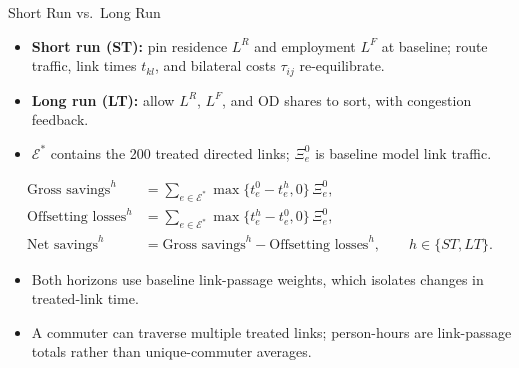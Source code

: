 \documentclass[11pt,aspectratio=169]{beamer}
\begin{document}
\begin{frame}{Short Run vs.\ Long Run}
\small
\begin{itemize}
  \item \textbf{Short run (ST):} pin residence $L^R$ and employment $L^F$ at baseline; route traffic, link times $t_{kl}$, and bilateral costs $\tau_{ij}$ re-equilibrate.
  \item \textbf{Long run (LT):} allow $L^R$, $L^F$, and OD shares to sort, with congestion feedback.
  \item $\mathcal E^*$ contains the 200 treated directed links; $\Xi_e^0$ is baseline model link traffic.
\end{itemize}
\vspace{-0.35em}
{\scriptsize
\begin{align*}
\text{Gross savings}^{h}
  &=\sum_{e\in\mathcal E^*}\max\{t_e^0-t_e^h,0\}\,\Xi_e^0,\\
\text{Offsetting losses}^{h}
  &=\sum_{e\in\mathcal E^*}\max\{t_e^h-t_e^0,0\}\,\Xi_e^0,\\
\text{Net savings}^{h}
  &=\text{Gross savings}^{h}-\text{Offsetting losses}^{h},
  \qquad h\in\{ST,LT\}.
\end{align*}
}
\vspace{-0.9em}
\begin{itemize}\scriptsize\setlength\itemsep{0.25em}
  \item Both horizons use baseline link-passage weights, which isolates changes in treated-link time.
  \item A commuter can traverse multiple treated links; person-hours are link-passage totals rather than unique-commuter averages.
\end{itemize}
\end{frame}
\end{document}
